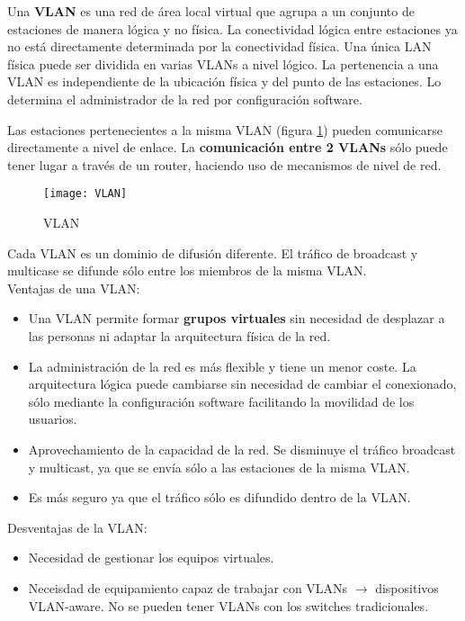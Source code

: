 \documentclass[10pt,portrait, twocolumn]{article}
\begin{document}
Una \textbf{VLAN} es una red de área local virtual que agrupa a un conjunto de estaciones de manera lógica y no física. La conectividad lógica entre estaciones ya no está directamente determinada por la conectividad física. Una única LAN física puede ser dividida en varias VLANs a nivel lógico. La pertenencia a una VLAN es independiente de la ubicación física y del punto de las estaciones. Lo determina el administrador de la red por configuración software.

	\quad Las estaciones pertenecientes a la misma VLAN (figura \ref{fig:VLAN}) pueden comunicarse directamente a nivel de enlace. La \textbf{comunicación entre 2 VLANs} sólo puede tener lugar a través de un router, haciendo uso de mecanismos de nivel de red.

\begin{figure}[!ht]	
			\centering
		    	\texttt{[image: VLAN]}
			\caption{VLAN}
			\label{fig:VLAN}
		\end{figure}  


Cada VLAN es un dominio de difusión diferente. El tráfico de broadcast y multicase se difunde sólo entre los miembros de la misma VLAN.\\

Ventajas de una VLAN:

	\begin{itemize}
	\item Una VLAN permite formar \textbf{grupos virtuales} sin necesidad de desplazar a las personas ni adaptar la arquitectura física de la red.
	\item La administración de la red es más flexible y tiene un menor coste.  La arquitectura lógica puede  cambiarse sin necesidad de cambiar el conexionado, sólo mediante la configuración software facilitando la movilidad de los usuarios.
	\item Aprovechamiento de la capacidad de la red. Se disminuye el tráfico broadcast y multicast, ya que se envía sólo a las estaciones de la misma VLAN.
	\item Es más seguro ya que el tráfico sólo es difundido dentro de la VLAN.
	\end{itemize}

Desventajas de la VLAN:

	\begin{itemize}
	\item Necesidad de gestionar los equipos virtuales.
	\item Neceisdad de equipamiento capaz de trabajar con VLANs $\rightarrow$ dispositivos VLAN-aware. No se pueden tener VLANs con los switches tradicionales.
	\end{itemize}
	
\end{document}
